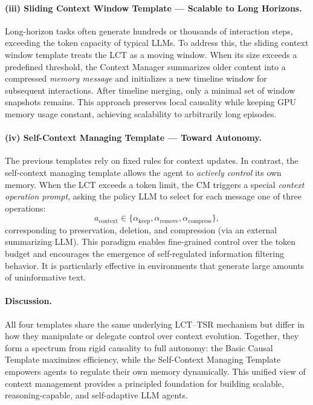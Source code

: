 \paragraph{(iii) Sliding Context Window Template — Scalable to Long Horizons.}
Long-horizon tasks often generate hundreds or thousands of interaction steps, exceeding the token capacity of typical LLMs. 
To address this, the sliding context window template treats the LCT as a moving window. 
When its size exceeds a predefined threshold, the Context Manager summarizes older content into a compressed \textit{memory message} and initializes a new timeline window for subsequent interactions. 
After timeline merging, only a minimal set of window snapshots remains. 
This approach preserves local causality while keeping GPU memory usage constant, achieving scalability to arbitrarily long episodes.

\paragraph{(iv) Self-Context Managing Template — Toward Autonomy.}
The previous templates rely on fixed rules for context updates. 
In contrast, the self-context managing template allows the agent to \emph{actively control} its own memory. 
When the LCT exceeds a token limit, the CM triggers a special \textit{context operation prompt}, asking the policy LLM to select for each message one of three operations:
\[
a_\text{context} \in \{\alpha_\text{keep}, \alpha_\text{remove}, \alpha_\text{compress}\},
\]
corresponding to preservation, deletion, and compression (via an external summarizing LLM).
This paradigm enables fine-grained control over the token budget and encourages the emergence of self-regulated information filtering behavior. 
It is particularly effective in environments that generate large amounts of uninformative text.

\paragraph{Discussion.}
All four templates share the same underlying LCT–TSR mechanism but differ in how they manipulate or delegate control over context evolution. 
Together, they form a spectrum from rigid causality to full autonomy: the Basic Causal Template maximizes efficiency, while the Self-Context Managing Template empowers agents to regulate their own memory dynamically. 
This unified view of context management provides a principled foundation for building scalable, reasoning-capable, and self-adaptive LLM agents.
